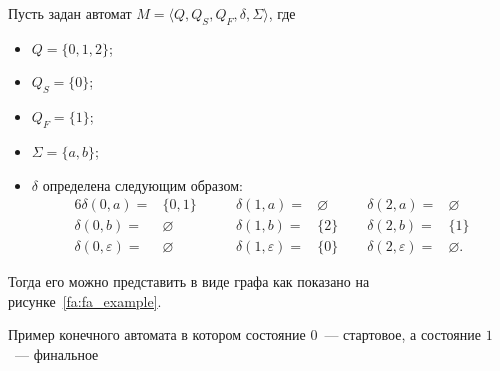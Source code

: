 \begin{example}
    Пусть задан автомат $M=\langle Q, Q_S, Q_F, \delta, \Sigma\rangle$, где
    \begin{itemize}
        \item $Q = \{0,1,2\}$;
        \item $Q_S = \{0\}$;
        \item $Q_F = \{1\}$;
        \item $\Sigma = \{a,b\}$;
        \item $\delta$ определена следующим образом: 
        \begin{alignat*}{6}
            \delta(0,a) =& \{0,1\}      \qquad    & \delta(1,a) =& \varnothing \qquad & \delta(2,a) =& \varnothing \\
            \delta(0,b) =& \varnothing           & \delta(1,b) =& \{2\}             & \delta(2,b) =& \{1\} \\
            \delta(0,\varepsilon) =& \varnothing & \delta(1,\varepsilon) =& \{0\}   & \delta(2,\varepsilon) =& \varnothing.
        \end{alignat*}
    \end{itemize}
    Тогда его можно представить в виде графа как показано на рисунке~\ref{fa:fa_example}.
    \begin{marginfigure}    
        \begin{center}
        \end{center}
        \caption{Пример конечного автомата в котором состояние $0$~--- стартовое, а состояние $1$~--- финальное}
        \label{fa:fa_example}
    \end{marginfigure}
\end{example}

